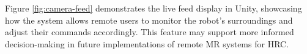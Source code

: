 Figure \ref{fig:camera-feed} demonstrates the live feed display in Unity, showcasing how the system allows remote users to monitor the robot’s surroundings and adjust their commands accordingly. This feature may support more informed decision-making in future implementations of remote \ac{MR} systems for \ac{HRC}.


